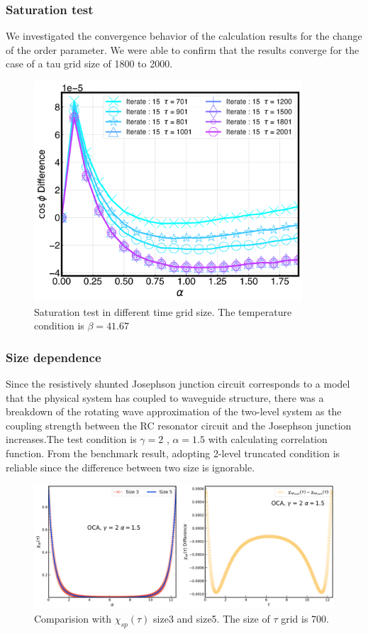 \documentclass{article}[12pt]
\begin{document}
\begin{spacing}{1.5}
\subsubsection*{Saturation test}
We investigated the convergence behavior of the calculation results for the change of the order parameter. 
We were able to confirm that the results converge for the case of a tau grid size of 1800 to 2000. 
\begin{figure}[htbp]
  \centerline{\includegraphics[width=10cm]{TexFigure/Diff_Ns3_g_b_35.71_41.67_n_15_tauchange (1)-1.png}}
  \caption{Saturation test in different time grid size. The temperature condition is $\beta = 41.67$}
\end{figure}
\subsubsection*{Size dependence}
Since the resistively shunted Josephson junction circuit corresponds to a model that the physical system has coupled to waveguide structure,
there was a breakdown of the rotating wave approximation of the two-level system as the coupling strength between the RC resonator circuit 
and the Josephson junction increases.The test condition is $\gamma =2$ , $\alpha = 1.5$ with calculating correlation function. 
From the benchmark result, adopting 2-level truncated condition is reliable since the difference between two size is ignorable.
\begin{figure}[H]
  \centerline{\includegraphics[width=15cm]{TexFigure/Sizediff.png}}
  \caption{Comparision with $\chi_{sp}(\tau)$ size3 and size5. The size of $\tau$ grid is 700.}
\end{figure}
\pagebreak

\end{spacing}
\end{document}
